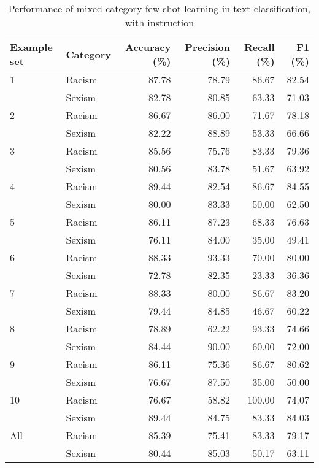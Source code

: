 \documentclass{bmcart}
\begin{document}
\begin{backmatter}
\begin{table}
\caption{\label{tab:fewshotmixedinstructsummary}Performance of mixed-category few-shot learning in text classification, with instruction}
\centering
\begin{tabular}[t]{llrrrr}
\hline
Example set & Category & Accuracy (\%) & Precision (\%) & Recall (\%) & F1 (\%)\\
\hline
1 & Racism & 87.78 & 78.79 & 86.67 & 82.54\\
 & Sexism & 82.78 & 80.85 & 63.33 & 71.03\\
\hline
2 & Racism & 86.67 & 86.00 & 71.67 & 78.18\\
 & Sexism & 82.22 & 88.89 & 53.33 & 66.66\\
\hline
3 & Racism & 85.56 & 75.76 & 83.33 & 79.36\\
 & Sexism & 80.56 & 83.78 & 51.67 & 63.92\\
\hline
4 & Racism & 89.44 & 82.54 & 86.67 & 84.55\\
 & Sexism & 80.00 & 83.33 & 50.00 & 62.50\\
\hline
5 & Racism & 86.11 & 87.23 & 68.33 & 76.63\\
 & Sexism & 76.11 & 84.00 & 35.00 & 49.41\\
\hline
6 & Racism & 88.33 & 93.33 & 70.00 & 80.00\\
 & Sexism & 72.78 & 82.35 & 23.33 & 36.36\\
\hline
7 & Racism & 88.33 & 80.00 & 86.67 & 83.20\\
 & Sexism & 79.44 & 84.85 & 46.67 & 60.22\\
\hline
8 & Racism & 78.89 & 62.22 & 93.33 & 74.66\\
 & Sexism & 84.44 & 90.00 & 60.00 & 72.00\\
\hline
9 & Racism & 86.11 & 75.36 & 86.67 & 80.62\\
 & Sexism & 76.67 & 87.50 & 35.00 & 50.00\\
\hline
10 & Racism & 76.67 & 58.82 & 100.00 & 74.07\\
 & Sexism & 89.44 & 84.75 & 83.33 & 84.03\\
\hline
All & Racism & 85.39 & 75.41 & 83.33 & 79.17\\
 & Sexism & 80.44 & 85.03 & 50.17 & 63.11\\
\hline
\end{tabular}
\end{table}





\end{backmatter}
\end{document}
